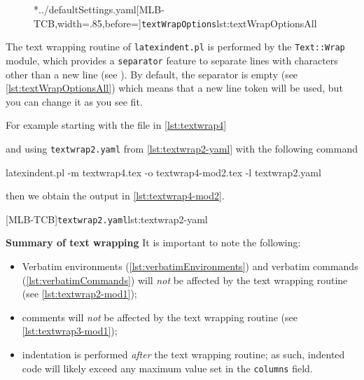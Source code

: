 
	\begin{figure}
		\cmhlistingsfromfile[style=textWrapOptionsAll]*{../defaultSettings.yaml}[MLB-TCB,width=.85\linewidth,before=\centering]{\texttt{textWrapOptions}}{lst:textWrapOptionsAll}
	\end{figure}
	The text wrapping routine of \texttt{latexindent.pl} is performed by the \texttt{Text::Wrap} module, which provides a
	\texttt{separator} feature to separate lines with characters other than a new line (see \cite{textwrap}). By default,
	the separator is empty (see \cref{lst:textWrapOptionsAll}) which means that a new line token will be used, but you can change it as you see fit.

	For example starting with the file in \cref{lst:textwrap4}

	and using \texttt{textwrap2.yaml} from \cref{lst:textwrap2-yaml} with the following command
	\begin{commandshell}
latexindent.pl -m textwrap4.tex -o textwrap4-mod2.tex -l textwrap2.yaml
\end{commandshell}
	then we obtain the output in \cref{lst:textwrap4-mod2}.

	\begin{minipage}{.45\linewidth}
	\end{minipage}
	\hfill
	\begin{minipage}{.45\linewidth}
		[MLB-TCB]{\texttt{textwrap2.yaml}}{lst:textwrap2-yaml}
	\end{minipage}

	\textbf{Summary of text wrapping}
	It is important to note the following:
	\begin{itemize}
		\item Verbatim environments (\vref{lst:verbatimEnvironments}) and verbatim commands (\vref{lst:verbatimCommands}) will \emph{not} be affected by the text wrapping routine (see \vref{lst:textwrap2-mod1});
		\item comments will \emph{not} be affected by the text wrapping routine (see \vref{lst:textwrap3-mod1});
		\item indentation is performed \emph{after} the text wrapping routine; as such, indented code
		      will likely exceed any maximum value set in the \texttt{columns} field.
	\end{itemize}

